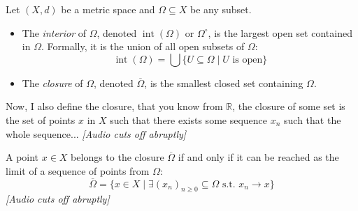 \begin{math-stroke}
\setcounter{theorem}{45}
\begin{definition}\label{def:interior-closure}
Let $(X, d)$ be a metric space and $\Omega \subseteq X$ be any subset.
\begin{itemize}
    \setcounter{enumi}{0} \item The \emph{interior} of $\Omega$, denoted $\operatorname{int}(\Omega)$ or $\Omega^\circ$, is the largest open set contained in $\Omega$. Formally, it is the union of all open subsets of $\Omega$:
    \[ \operatorname{int}(\Omega) = \bigcup \{ U \subseteq \Omega \mid U \text{ is open} \} \]
    \item The \emph{closure} of $\Omega$, denoted $\overline{\Omega}$, is the smallest closed set containing $\Omega$.
\end{itemize}
\end{definition}
\end{math-stroke}

\begin{spoken-clean}[00:28:30 - 00:29:59]
Now, I also define the closure, that you know from $\mathbb{R}$, the closure of some set is the set of points $x$ in $X$ such that there exists some sequence $x_n$ such that the whole sequence... \textit{[Audio cuts off abruptly]}
\end{spoken-clean}

\begin{math-stroke}
A point $x \in X$ belongs to the closure $\overline{\Omega}$ if and only if it can be reached as the limit of a sequence of points from $\Omega$:
\[ \overline{\Omega} = \{ x \in X \mid \exists (x_n)_{n \ge 0} \subseteq \Omega \text{ s.t. } x_n \to x \} \]
\textit{[Audio cuts off abruptly]}
\end{math-stroke}

